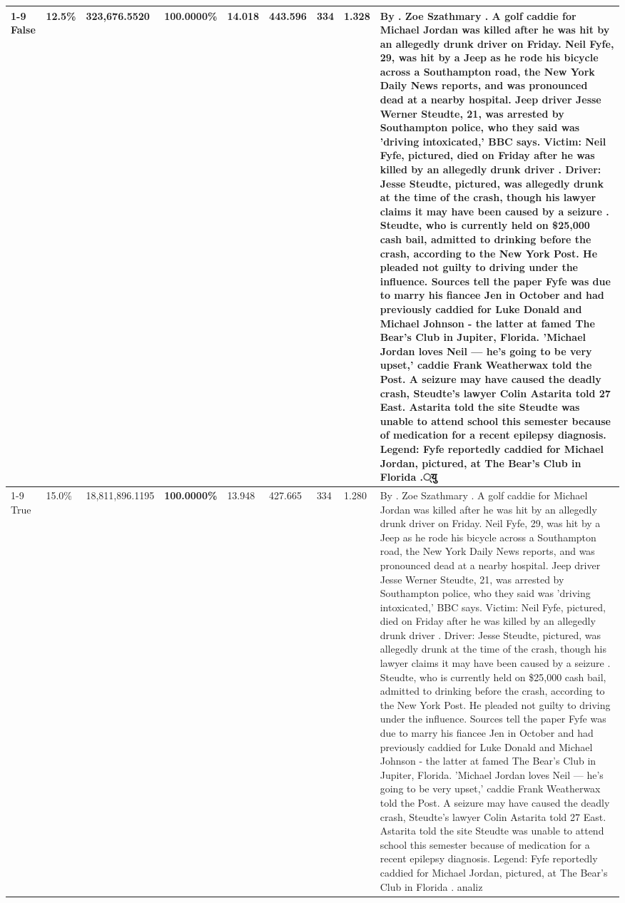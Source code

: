 \begin{table}[H]
\begin{tabular}{lllrlllll}
\cline{1-9}
False & 12.5\% & 323,676.5520 & \bfseries \color{red} 100.0000\% & 14.018 & 443.596 & 334 & 1.328 & By . Zoe Szathmary . A golf caddie for Michael Jordan was killed after he was hit by an allegedly drunk driver on Friday. Neil Fyfe, 29, was hit by a Jeep as he rode his bicycle across a Southampton road, the New York Daily News reports, and was pronounced dead at a nearby hospital. Jeep driver Jesse Werner Steudte, 21, was arrested by Southampton police, who they said was 'driving intoxicated,' BBC says. Victim: Neil Fyfe, pictured, died on Friday after he was killed by an allegedly drunk driver . Driver: Jesse Steudte, pictured, was allegedly drunk at the time of the crash, though his lawyer claims it may have been caused by a seizure . Steudte, who is currently held on \$25,000 cash bail, admitted to drinking before the crash, according to the New York Post. He pleaded not guilty to driving under the influence. Sources tell the paper Fyfe was due to marry his fiancee Jen in October and had previously caddied for Luke Donald and Michael Johnson - the latter at famed The Bear's Club in Jupiter, Florida. 'Michael Jordan loves Neil — he’s going to be very upset,' caddie Frank Weatherwax told the Post. A seizure may have caused the deadly crash, Steudte's lawyer Colin Astarita told 27 East. Astarita told the site Steudte was unable to attend school this semester because of medication for a recent epilepsy diagnosis. Legend: Fyfe reportedly caddied for Michael Jordan, pictured, at The Bear's Club in Florida .्यु \\
\cline{1-9}
True & 15.0\% & 18,811,896.1195 & \bfseries \color{red} 100.0000\% & 13.948 & 427.665 & 334 & 1.280 & By . Zoe Szathmary . A golf caddie for Michael Jordan was killed after he was hit by an allegedly drunk driver on Friday. Neil Fyfe, 29, was hit by a Jeep as he rode his bicycle across a Southampton road, the New York Daily News reports, and was pronounced dead at a nearby hospital. Jeep driver Jesse Werner Steudte, 21, was arrested by Southampton police, who they said was 'driving intoxicated,' BBC says. Victim: Neil Fyfe, pictured, died on Friday after he was killed by an allegedly drunk driver . Driver: Jesse Steudte, pictured, was allegedly drunk at the time of the crash, though his lawyer claims it may have been caused by a seizure . Steudte, who is currently held on \$25,000 cash bail, admitted to drinking before the crash, according to the New York Post. He pleaded not guilty to driving under the influence. Sources tell the paper Fyfe was due to marry his fiancee Jen in October and had previously caddied for Luke Donald and Michael Johnson - the latter at famed The Bear's Club in Jupiter, Florida. 'Michael Jordan loves Neil — he’s going to be very upset,' caddie Frank Weatherwax told the Post. A seizure may have caused the deadly crash, Steudte's lawyer Colin Astarita told 27 East. Astarita told the site Steudte was unable to attend school this semester because of medication for a recent epilepsy diagnosis. Legend: Fyfe reportedly caddied for Michael Jordan, pictured, at The Bear's Club in Florida . analiz \\

\end{tabular}
\end{table}

